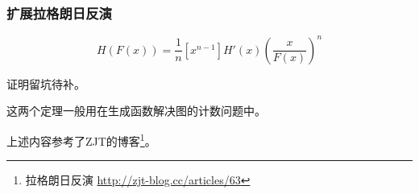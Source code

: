 \subsubsection{扩展拉格朗日反演}
\begin{theorem}
	\begin{displaymath}
		[x_n]H(F(x))=\frac{1}{n}[x^{n-1}]H'(x)(\frac{x}{F(x)})^n
	\end{displaymath}
\end{theorem}
证明留坑待补。

这两个定理一般用在生成函数解决图的计数问题中。

上述内容参考了ZJT的博客\footnote{
	拉格朗日反演
	\url{http://zjt-blog.cc/articles/63}
}。
